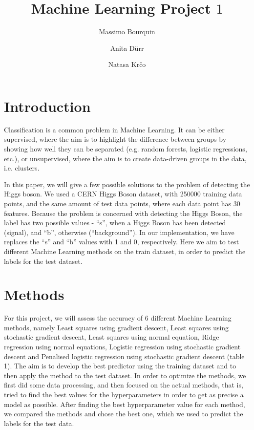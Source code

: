 \documentclass{article}
\begin{document}
	\title{Machine Learning Project $1$}
	
	\author{Massimo Bourquin \and Anita D\" urr \and Natasa Kr\v co}
	
	\maketitle
	
	\section{Introduction}
	
	Classification is a common problem in Machine Learning. It can be either supervised, where the aim is to highlight the difference between groups by showing how well they can be separated (e.g. random forests, logistic regressions, etc.), or unsupervised, where the aim is to create data-driven groups in the data, i.e. clusters.
	
	In this paper, we will give a few possible solutions to the problem of detecting the Higgs boson. We used a CERN Higgs Boson dataset, with 250000 training data points, and the same amount of test data points, where each data point has 30 features. Because the problem is concerned with detecting the Higgs Boson, the label has two possible values - “s”, when a Higgs Boson has been detected (signal), and “b”, otherwise (“background”). In our implementation, we have replaces the “s” and “b” values with 1 and 0, respectively.
	Here we aim to test different Machine Learning methods on the train dataset, in order to predict the labels for the test dataset.
	
	
	\section{Methods}
	For this project, we will assess the accuracy of 6 different Machine Learning methods, namely Least squares using gradient descent, Least squares using stochastic gradient descent, Least squares using normal equation, Ridge regression using normal equations, Logistic regression using stochastic gradient descent and Penalised logistic regression using stochastic gradient descent (table 1). The aim is to develop the best predictor using the training dataset and to then apply the method to the test dataset.
	In order to optimize the methods, we first did some data processing, and then focused on the actual methods, that is, tried to find the best values for the hyperparameters in order to get as precise a model as possible. After finding the best hyperparameter value for each method, we compared the methods and chose the best one, which we used to predict the labels for the test data.
	
\end{document}
